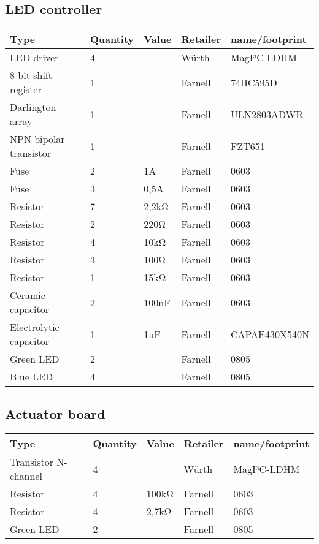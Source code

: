 \documentclass[10pt, titlepage]{article}
\begin{document}
\subsection{LED controller}
\begin{center}
\begin{tabularx}{\textwidth}{|X|l|l|l|l|}
    \hline
   \textbf{Type} & \textbf{Quantity} & \textbf{Value} & \textbf{Retailer} & \textbf{name/footprint} \\ \hline
    LED-driver & 4 &  & Würth & MagI³C-LDHM \\ \hline
    8-bit shift register & 1 &  & Farnell & 74HC595D \\ \hline
    Darlington array & 1 &  & Farnell & ULN2803ADWR \\ \hline
    NPN bipolar transistor & 1 &  & Farnell & FZT651   \\ \hline
    Fuse & 2 & 1A & Farnell & 0603 \\ \hline
    Fuse & 3 & 0,5A & Farnell & 0603 \\ \hline
    Resistor & 7 & 2,2kΩ & Farnell & 0603 \\ \hline
    Resistor & 2 & 220Ω & Farnell & 0603 \\ \hline
    Resistor & 4 & 10kΩ & Farnell & 0603\\ \hline
    Resistor & 3 & 100Ω & Farnell & 0603 \\ \hline
    Resistor & 1 & 15kΩ & Farnell & 0603  \\ \hline
    Ceramic capacitor & 2 & 100nF & Farnell & 0603 \\ \hline
    Electrolytic capacitor & 1 & 1uF & Farnell & CAPAE430X540N \\ \hline
    Green LED & 2 &  & Farnell & 0805 \\ \hline
    Blue LED & 4 &  & Farnell & 0805 \\ \hline
	\end{tabularx}
\end{center}

\subsection{Actuator board}
\begin{center}
\begin{tabularx}{\textwidth}{|X|l|l|l|l|}
    \hline
   \textbf{Type} & \textbf{Quantity} & \textbf{Value} & \textbf{Retailer} & \textbf{name/footprint} \\ \hline
    Transistor N-channel & 4 &  & Würth & MagI³C-LDHM \\ \hline
    Resistor  & 4 & 100kΩ & Farnell & 0603 \\ \hline
    Resistor  & 4 & 2,7kΩ & Farnell & 0603 \\ \hline
    Green LED & 2 &  & Farnell & 0805 \\ \hline
	\end{tabularx}
\end{center}
\end{document}
